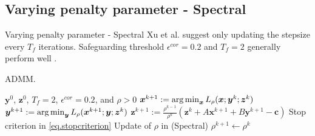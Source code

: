\documentclass[8pt,red]{beamer}
\theoremstyle{plain}
\theoremstyle{definition}
\theoremstyle{remark}
\newcommand{\argmin}{\operatornamewithlimits{\mathrm{arg\,min}}}
\newcommand{\bi}[1]{\ensuremath{\boldsymbol{#1}}}
\begin{document}
\subsection{Varying penalty parameter - Spectral}
\begin{frame}{Varying penalty parameter - Spectral}
Xu et al. suggest only updating the stepsize every $T_{f}$ iterations. Safeguarding threshold $\epsilon^{cor} = 0.2$ and $T_{f} = 2$ generally perform well \citep{xu2016adaptive}.

\begin{algorithm}[H]
  \scriptsize
  \caption{ADMM.}
  \label{alg:prototype.vp-N-Spectral}
  \begin{algorithmic}[1]
    \Require
    $\bi{y}^{0}$, $\bi{z}^{0}$, $T_{f} = 2$, $\epsilon^{cor} = 0.2$, and $\rho > 0$ 
    \State
    $\bi{x}^{k+1} 
    := \argmin_{\bi{x}} L_{\rho}(\bi{x};{\bi{y}}^{k};{\bi{z}}^{k})$ 
    \State
    $\bi{y}^{k+1} 
    := \argmin_{\bi{y}} L_{\rho}(\bi{x}^{k+1};\bi{y};{\bi{z}}^{k})$ 
    \State
    $\bi{z}^{k+1} 
  := \frac{\rho^{k-1}}{\rho^{k}} \left( \bi{z}^{k} + A \bi{x}^{k+1} + B \bi{y}^{k+1} - \bi{c} \right)$ 
    \State
    Stop criterion in \eqref{eq.stopcriterion}
    \State
    Update of $\rho$ in (Spectral)
    \Else
    \State
    $\rho^{k+1} \leftarrow \rho^{k}$
    \EndIf
    \EndFor
  \end{algorithmic}
\end{algorithm}
\end{frame}
\end{document}
